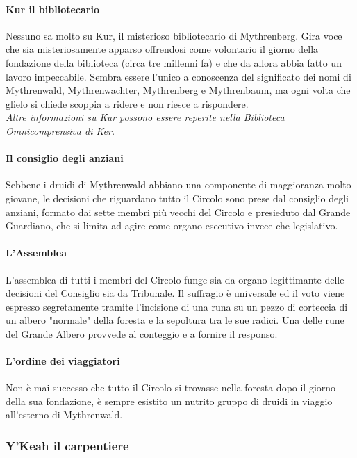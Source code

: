 \paragraph{Kur il bibliotecario} Nessuno sa molto su Kur, il misterioso bibliotecario di Mythrenberg. Gira voce che sia misteriosamente apparso offrendosi come volontario il giorno della fondazione della biblioteca (circa tre millenni fa) e che da allora abbia fatto un lavoro impeccabile. Sembra essere l'unico a conoscenza del significato dei nomi di Mythrenwald, Mythrenwachter, Mythrenberg e Mythrenbaum, ma ogni volta che glielo si chiede scoppia a ridere e non riesce a rispondere. \\ \textit{Altre informazioni su Kur possono essere reperite nella Biblioteca Omnicomprensiva di Ker.}

\paragraph{Il consiglio degli anziani} Sebbene i druidi di Mythrenwald abbiano una componente di maggioranza molto giovane, le decisioni che riguardano tutto il Circolo sono prese dal consiglio degli anziani, formato dai sette membri più vecchi del Circolo e presieduto dal Grande Guardiano, che si limita ad agire come organo esecutivo invece che legislativo.

\paragraph{L'Assemblea} L'assemblea di tutti i membri del Circolo funge sia da organo legittimante delle decisioni del Consiglio sia da Tribunale. Il suffragio è universale ed il voto viene espresso segretamente tramite l'incisione di una runa su un pezzo di corteccia di un albero "normale" della foresta e la sepoltura tra le sue radici. Una delle rune del Grande Albero provvede al conteggio e a fornire il responso.

\paragraph{L'ordine dei viaggiatori} Non è mai successo che tutto il Circolo si trovasse nella foresta dopo il giorno della sua fondazione, è sempre esistito un nutrito gruppo di druidi in viaggio all'esterno di Mythrenwald.

\subsubsection{Y'Keah il carpentiere}

